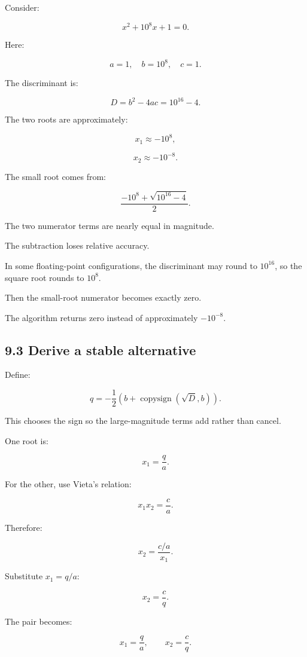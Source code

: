 Consider:

\[ x^2+10^8x+1=0. \]

Here:

\[ a=1,\quad b=10^8,\quad c=1. \]

The discriminant is:

\[ D=b^2-4ac=10^{16}-4. \]

The two roots are approximately:

\[ x_1\approx-10^8, \]

\[ x_2\approx-10^{-8}. \]

The small root comes from:

\[ \frac{-10^8+\sqrt{10^{16}-4}}2. \]

The two numerator terms are nearly equal in magnitude.

The subtraction loses relative accuracy.

In some floating-point configurations, the discriminant may round to \(10^{16}\), so the square root rounds to \(10^8\).

Then the small-root numerator becomes exactly zero.

The algorithm returns zero instead of approximately \(-10^{-8}\).

\subsection{9.3 Derive a stable alternative}\label{02-foundations-ii-ch028-derive-a-stable-alternative}

\hypertarget{02-foundations-ii-ch028-derive-a-stable-alternative}{}

Define:

\[ \boxed{ q= -\frac12\left(b+\operatorname{copysign}(\sqrt D,b)\right) }. \]

This chooses the sign so the large-magnitude terms add rather than cancel.

One root is:

\[ \boxed{x_1=\frac qa}. \]

For the other, use Vieta's relation:

\[ x_1x_2=\frac ca. \]

Therefore:

\[ x_2=\frac{c/a}{x_1}. \]

Substitute \(x_1=q/a\):

\[ \boxed{x_2=\frac cq}. \]

The pair becomes:

\[ \boxed{ x_1=\frac qa, \qquad x_2=\frac cq }. \]


